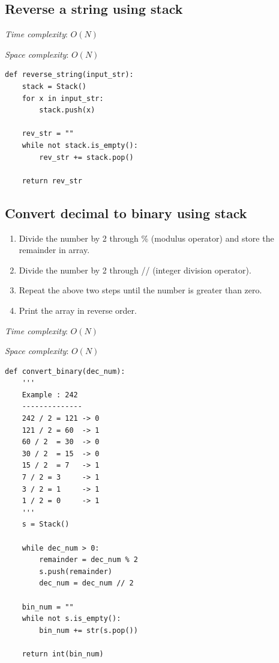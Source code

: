 \documentclass[a4paper,11pt]{book}
\begin{document}
\subsection{Reverse a string using stack}

\noindent \textit{Time complexity}: $O(N)$

\noindent \textit{Space complexity}: $O(N)$

\begin{lstlisting}
def reverse_string(input_str):
    stack = Stack()
    for x in input_str:
        stack.push(x)

    rev_str = ""
    while not stack.is_empty():
        rev_str += stack.pop()

    return rev_str
\end{lstlisting}

\subsection{Convert decimal to binary using stack}

\begin{enumerate}
    \item Divide the number by 2 through \% (modulus operator) and store the remainder in array.
    \item Divide the number by 2 through // (integer division operator).
    \item Repeat the above two steps until the number is greater than zero.
    \item Print the array in reverse order.
\end{enumerate}

\noindent \textit{Time complexity}: $O(N)$

\noindent \textit{Space complexity}: $O(N)$

\begin{lstlisting}
def convert_binary(dec_num):
    '''
    Example : 242
    --------------
    242 / 2 = 121 -> 0
    121 / 2 = 60  -> 1
    60 / 2  = 30  -> 0
    30 / 2  = 15  -> 0
    15 / 2  = 7   -> 1
    7 / 2 = 3     -> 1
    3 / 2 = 1     -> 1
    1 / 2 = 0	  -> 1
    '''
    s = Stack()

    while dec_num > 0:
        remainder = dec_num % 2
        s.push(remainder)
        dec_num = dec_num // 2

    bin_num = ""
    while not s.is_empty():
        bin_num += str(s.pop())

    return int(bin_num)
\end{lstlisting}
\end{document}
